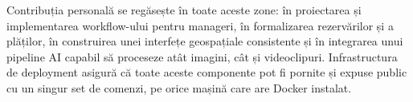 Contribuția personală se regăsește în toate aceste zone: în proiectarea și implementarea workflow-ului pentru manageri, în formalizarea rezervărilor și a plăților, în construirea unei interfețe geospațiale consistente și în integrarea unui pipeline AI capabil să proceseze atât imagini, cât și videoclipuri. Infrastructura de deployment asigură că toate aceste componente pot fi pornite și expuse public cu un singur set de comenzi, pe orice mașină care are Docker instalat.
